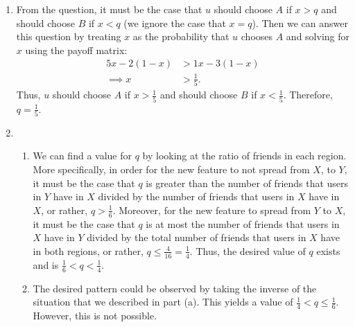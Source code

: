 \documentclass{article}
\begin{document}
\begin{enumerate}
   \item From the question, it must be the case that $u$ should choose $A$ if $x>q$ and should choose $B$ if $x<q$ (we ignore the case that $x=q$). Then we can answer this question by treating $x$ as the probability that $u$ chooses $A$ and solving for $x$ using the payoff matrix:
   \begin{align*}
        5x-2(1-x) & >1x-3(1-x) \\
        \implies x & >\frac{1}{5}.
   \end{align*}
   Thus, $u$ should choose $A$ if $x>\frac{1}{5}$ and should choose $B$ if $x<\frac{1}{5}$. Therefore, $q=\frac{1}{5}$.

   \item \begin{enumerate}
        \item We can find a value for $q$ by looking at the ratio of friends in each region. More specifically, in order for the new feature to not spread from $X$, to $Y$, it must be the case that $q$ is greater than the number of friends that users in $Y$ have in $X$ divided by the number of friends that users in $X$ have in $X$, or rather, $q>\frac{1}{6}$. Moreover, for the new feature to spread from $Y$ to $X$, it must be the case that $q$ is at most the number of friends that users in $X$ have in $Y$ divided by the total number of friends that users in $X$ have in both regions, or rather, $q\leq\frac{4}{16}=\frac{1}{4}$. Thus, the desired value of $q$ exists and is $\frac{1}{6}<q<\frac{1}{4}$.
        
        \item The desired pattern could be observed by taking the inverse of the situation that we described in part (a). This yields a value of $\frac{1}{4}<q\leq\frac{1}{6}$. However, this is not possible.
   \end{enumerate}
\end{enumerate}
\end{document}

